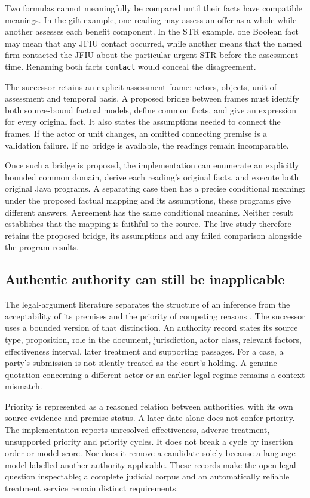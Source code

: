 Two formulas cannot meaningfully be compared until their facts have compatible
meanings. In the gift example, one reading may assess an offer as a whole while
another assesses each benefit component. In the STR example, one Boolean fact
may mean that any JFIU contact occurred, while another means that the named firm
contacted the JFIU about the particular urgent STR before the assessment time.
Renaming both facts \texttt{contact} would conceal the disagreement.

The successor retains an explicit assessment frame: actors, objects, unit of
assessment and temporal basis. A proposed bridge between frames must identify
both source-bound factual models, define common facts, and give an expression
for every original fact. It also states the assumptions needed to connect the
frames. If the actor or unit changes, an omitted connecting premise is a
validation failure. If no bridge is available, the readings remain incomparable.

Once such a bridge is proposed, the implementation can enumerate an explicitly
bounded common domain, derive each reading's original facts, and execute both
original Java programs. A separating case then has a precise conditional
meaning: under the proposed factual mapping and its assumptions, these programs
give different answers. Agreement has the same conditional meaning. Neither
result establishes that the mapping is faithful to the source. The live study
therefore retains the proposed bridge, its assumptions and any failed comparison
alongside the program results.

\subsection{Authentic authority can still be inapplicable}

The legal-argument literature separates the structure of an inference from the
acceptability of its premises and the priority of competing reasons
\citep[secs.~2--3]{aspic2010}\citep[secs.~3--6]{carneades2007}.
The successor uses a bounded version of that distinction. An authority record
states its source type, proposition, role in the document, jurisdiction, actor
class, relevant factors, effectiveness interval, later treatment and supporting
passages. For a case, a party's submission is not silently treated as the
court's holding. A genuine quotation concerning a different actor or an earlier
legal regime remains a context mismatch.

Priority is represented as a reasoned relation between authorities, with its
own source evidence and premise status. A later date alone does not confer
priority. The implementation reports unresolved effectiveness, adverse treatment,
unsupported priority and priority cycles. It does not break a cycle by insertion
order or model score. Nor does it remove a candidate solely because a language
model labelled another authority applicable. These records make the open legal
question inspectable; a complete judicial corpus and an automatically reliable
treatment service remain distinct requirements.

